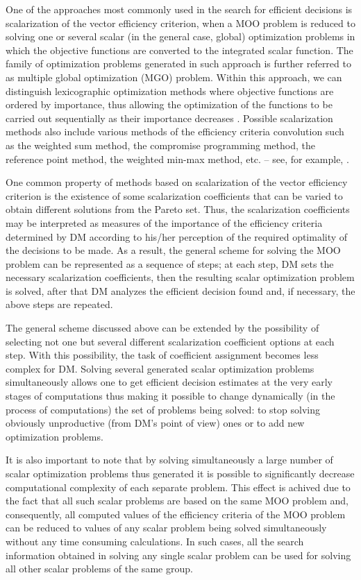 \documentclass[runningheads]{llncs}
\begin{document}
One of the approaches most commonly used in the search for efficient decisions is scalarization of the vector efficiency criterion, when a MOO problem is reduced to solving one or several scalar (in the general case, global) optimization problems in which the objective functions are converted to the integrated scalar function. The family of optimization problems generated in such approach is further referred to as multiple global optimization (MGO) problem. Within this approach, we can distinguish lexicographic optimization methods where objective functions are ordered by importance, thus  allowing the optimization of the functions to be carried out sequentially as their importance decreases \cite{c10}. Possible scalarization methods also include various methods of the efficiency criteria convolution such as the weighted sum method, the compromise programming method, the reference point method, the weighted min-max method, etc. -- see, for example, \cite{c2,c11,c12}. 

One common property of methods based on scalarization of the vector efficiency criterion is the existence of some scalarization coefficients that can be varied to obtain different solutions from the Pareto set. Thus, the scalarization coefficients may be interpreted as measures of the importance of the efficiency criteria determined by DM according to his/her perception of the required optimality of the decisions to be made. As a result, the general scheme for solving the MOO problem can be represented as a sequence of steps; at each step, DM sets the necessary scalarization coefficients, then the resulting scalar optimization problem is solved, after that DM analyzes the efficient decision found and, if necessary, the above steps are repeated.

The general scheme discussed above can be extended by the possibility of selecting not one but several different scalarization coefficient options at each step. With this possibility, the task of coefficient assignment becomes less complex for DM. Solving several generated scalar optimization problems simultaneously allows one to get efficient decision estimates at the very early stages of computations thus making it possible to change dynamically (in the process of computations) the set of problems being solved: to stop solving obviously unproductive (from DM's point of view) ones or to add new optimization problems.

It is also important to note that by solving simultaneously a large number of scalar optimization problems thus generated it is possible to significantly decrease computational complexity of each separate problem. This effect is achived due to the fact that all such scalar problems  are based on the same MOO problem and, consequently, all computed values of the efficiency criteria of the MOO problem can be reduced to values of any scalar problem being solved simultaneously without any time consuming calculations. In such cases, all the search information obtained in solving any single scalar problem can be used for solving all other scalar problems of the same group. 
\end{document}
